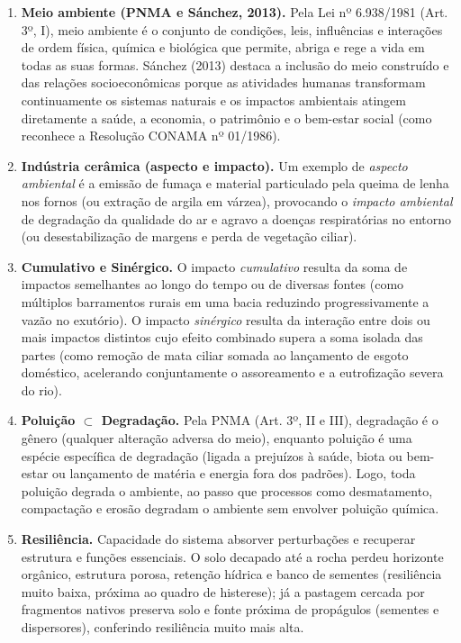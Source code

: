 \begin{boxGabarito}
\begin{enumerate}[leftmargin=1.8em, itemsep=4pt]
  \item \textbf{Meio ambiente (PNMA e Sánchez, 2013).} Pela Lei nº 6.938/1981 (Art. 3º, I), meio ambiente é o conjunto de condições, leis, influências e interações de ordem física, química e biológica que permite, abriga e rege a vida em todas as suas formas. Sánchez (2013) destaca a inclusão do meio construído e das relações socioeconômicas porque as atividades humanas transformam continuamente os sistemas naturais e os impactos ambientais atingem diretamente a saúde, a economia, o patrimônio e o bem-estar social (como reconhece a Resolução CONAMA nº 01/1986).
  \item \textbf{Indústria cerâmica (aspecto e impacto).} Um exemplo de \textit{aspecto ambiental} é a emissão de fumaça e material particulado pela queima de lenha nos fornos (ou extração de argila em várzea), provocando o \textit{impacto ambiental} de degradação da qualidade do ar e agravo a doenças respiratórias no entorno (ou desestabilização de margens e perda de vegetação ciliar).
  \item \textbf{Cumulativo e Sinérgico.} O impacto \textit{cumulativo} resulta da soma de impactos semelhantes ao longo do tempo ou de diversas fontes (como múltiplos barramentos rurais em uma bacia reduzindo progressivamente a vazão no exutório). O impacto \textit{sinérgico} resulta da interação entre dois ou mais impactos distintos cujo efeito combinado supera a soma isolada das partes (como remoção de mata ciliar somada ao lançamento de esgoto doméstico, acelerando conjuntamente o assoreamento e a eutrofização severa do rio).
  \item \textbf{Poluição $\subset$ Degradação.} Pela PNMA (Art. 3º, II e III), degradação é o gênero (qualquer alteração adversa do meio), enquanto poluição é uma espécie específica de degradação (ligada a prejuízos à saúde, biota ou bem-estar ou lançamento de matéria e energia fora dos padrões). Logo, toda poluição degrada o ambiente, ao passo que processos como desmatamento, compactação e erosão degradam o ambiente sem envolver poluição química.
  \item \textbf{Resiliência.} Capacidade do sistema absorver perturbações e recuperar estrutura e funções essenciais. O solo decapado até a rocha perdeu horizonte orgânico, estrutura porosa, retenção hídrica e banco de sementes (resiliência muito baixa, próxima ao quadro de histerese); já a pastagem cercada por fragmentos nativos preserva solo e fonte próxima de propágulos (sementes e dispersores), conferindo resiliência muito mais alta.
\end{enumerate}
\end{boxGabarito}

